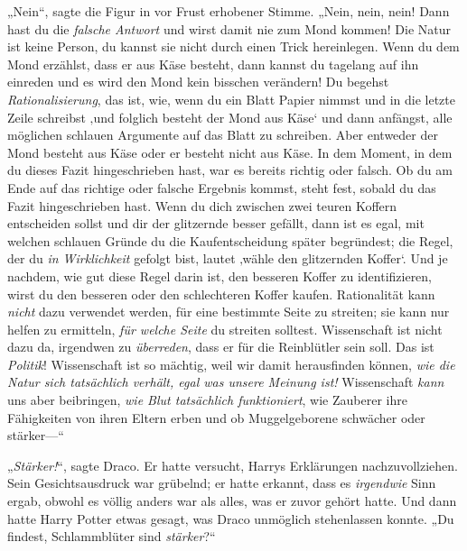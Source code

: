 „Nein“, sagte die Figur in vor Frust erhobener Stimme. „Nein, nein, nein! Dann hast du die \emph{falsche Antwort} und wirst damit nie zum Mond kommen! Die Natur ist keine Person, du kannst sie nicht durch einen Trick hereinlegen. Wenn du dem Mond erzählst, dass er aus Käse besteht, dann kannst du tagelang auf ihn einreden und es wird den Mond kein bisschen verändern! Du begehst \emph{Rationalisierung}, das ist, wie, wenn du ein Blatt Papier nimmst und in die letzte Zeile schreibst ‚und folglich besteht der Mond aus Käse‘ und dann anfängst, alle möglichen schlauen Argumente auf das Blatt zu schreiben. Aber entweder der Mond besteht aus Käse oder er besteht nicht aus Käse. In dem Moment, in dem du dieses Fazit hingeschrieben hast, war es bereits richtig oder falsch. Ob du am Ende auf das richtige oder falsche Ergebnis kommst, steht fest, sobald du das Fazit hingeschrieben hast. Wenn du dich zwischen zwei teuren Koffern entscheiden sollst und dir der glitzernde besser gefällt, dann ist es egal, mit welchen schlauen Gründe du die Kaufentscheidung später begründest; die Regel, der du \emph{in Wirklichkeit} gefolgt bist, lautet ‚wähle den glitzernden Koffer‘. Und je nachdem, wie gut diese Regel darin ist, den besseren Koffer zu identifizieren, wirst du den besseren oder den schlechteren Koffer kaufen. Rationalität kann \emph{nicht} dazu verwendet werden, für eine bestimmte Seite zu streiten; sie kann nur helfen zu ermitteln, \emph{für welche Seite} du streiten solltest. Wissenschaft ist nicht dazu da, irgendwen zu \emph{überreden}, dass er für die Reinblütler sein soll. Das ist \emph{Politik}! Wissenschaft ist so mächtig, weil wir damit herausfinden können, \emph{wie die Natur sich tatsächlich verhält, egal was unsere Meinung ist!} Wissenschaft \emph{kann} uns aber beibringen, \emph{wie Blut tatsächlich funktioniert}, wie Zauberer ihre Fähigkeiten von ihren Eltern erben und ob Muggelgeborene schwächer oder stärker—“

„\emph{Stärker!}“, sagte Draco. Er hatte versucht, Harrys Erklärungen nachzuvollziehen. Sein Gesichtsausdruck war grübelnd; er hatte erkannt, dass es \emph{irgendwie} Sinn ergab, obwohl es völlig anders war als alles, was er zuvor gehört hatte. Und dann hatte Harry Potter etwas gesagt, was Draco unmöglich stehenlassen konnte. „Du findest, Schlammblüter sind \emph{stärker}?“

